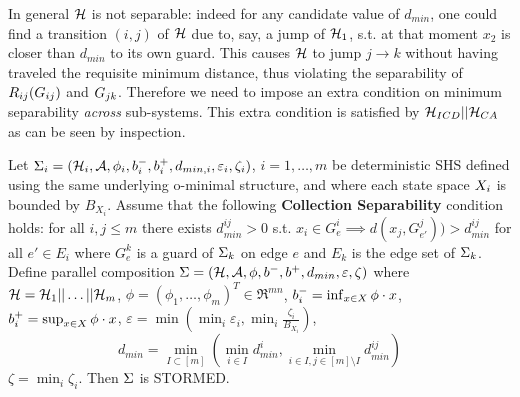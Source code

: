 In general $\mathcal{H}$ is not separable: indeed for any candidate value of $d_{min}$, one could find a transition $(i,j)$ of $\mathcal{H}$ due to, say, a jump of $\mathcal{H}_1$, s.t. at that moment $x_2$ is closer than $d_{min}$ to its own guard. 
This causes $\mathcal{H}$ to jump $j \rightarrow k$ without having traveled the requisite minimum distance, thus violating the separability of $R_{ij}(G_{ij})$ and $G_{jk}$.
Therefore we need to impose an extra condition on minimum separability \emph{across} sub-systems.
This extra condition is satisfied by $\mathcal{H}_{ICD}||\mathcal{H}_{CA}$ as can be seen by inspection.
\begin{thm}
	\label{thm:SHS composition}		
	Let $\Sigma_i = (\mathcal{H}_i, \mathcal{A}, \phi_i,b_i^-,b_i^+, d_{min,i}, \varepsilon_i, \zeta_i)$, $i=1,\ldots,m$ be deterministic SHS 
	defined using the same underlying o-minimal structure, 
	and where each state space $X_i$ is bounded by $B_{X_i}$.
	Assume that the following \textbf{Collection Separability} condition holds: 
	for all $i,j \leq m $ there exists $d_{min}^{ij}>0$ s.t.
	$x_i \in G^i_e \implies d(x_j,G^j_{e'}))>d_{min}^{ij}$ for all $e'\in E_i$ where $G^k_e$ is a guard of $\Sigma_k$ on edge $e$ and $E_k$ is the edge set of $\Sigma_k$.
	\\
	Define parallel composition $\Sigma = (\mathcal{H}, \mathcal{A}, \phi,b^-,b^+, d_{min}, \varepsilon, \zeta)$ where
	$\mathcal{H} = \mathcal{H}_1 || \ldots ||\mathcal{H}_m$,	
	$\phi = (\phi_1,\ldots,\phi_m)^T \in \Re^{mn}$,
	$b_i^- = \inf_{x \in X} \phi\cdot x$,
	$b_i^+ = \sup_{x \in X} \phi\cdot x$,
	$\varepsilon = \min(\min_i \varepsilon_i, \min_i \frac{\zeta_i}{B_{X_i}})$,
	\[d_{min} = \min_{I\subset [m]} (\min_{i\in I}d_{min}^i, \min_{i\in I ,j \in [m]\setminus I }d_{min}^{ij})\]	
	$\zeta = \min_i \zeta_i$.
Then $\Sigma$ is STORMED.
\end{thm}

